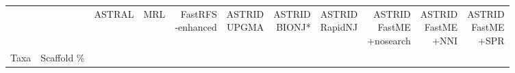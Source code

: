 \begin{table}[htb!]
    \begin{adjustbox}{width=1\textwidth}

\begin{tabular}{llrrrrrrrrr}
\hline
     &  &  ASTRAL &    MRL &  \makecell{FastRFS\\-enhanced} &  \makecell{ASTRID\\UPGMA} &  \makecell{ASTRID\\BIONJ*} &  \makecell{ASTRID\\RapidNJ} &  \makecell{ASTRID\\FastME\\+nosearch} &  \makecell{ASTRID\\FastME\\+NNI} &  \makecell{ASTRID\\FastME\\+SPR} \\
Taxa & Scaffold \% &         &        &                   &               &                &                 &                         &                    &                    \\


\end{tabular}
\end{adjustbox}
\end{table}
